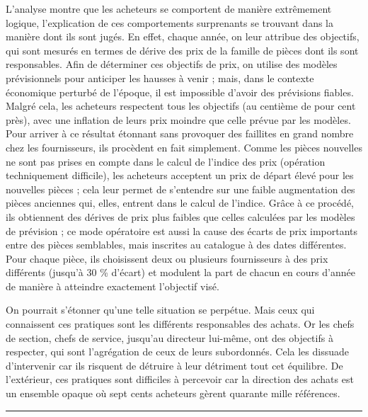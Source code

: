 \documentclass[oneside]{kaobook}
\begin{document}
L’analyse montre que les acheteurs se comportent de manière extrêmement logique, l’explication de ces comportements surprenants se trouvant dans la manière dont ils sont jugés. En effet, chaque année, on leur attribue des objectifs, qui sont mesurés en termes de dérive des prix de la famille de pièces dont ils sont responsables. Afin de déterminer ces objectifs de prix, on utilise des modèles prévisionnels pour anticiper les hausses à venir ; mais, dans le contexte économique perturbé de l’époque, il est impossible d’avoir des prévisions fiables. Malgré cela, les acheteurs respectent tous les objectifs (au centième de pour cent près), avec une inflation de leurs prix moindre que celle prévue par les modèles. Pour arriver à ce résultat étonnant sans provoquer des faillites en grand nombre chez les fournisseurs, ils procèdent en fait simplement. Comme les pièces nouvelles ne sont pas prises en compte dans le calcul de l’indice des prix (opération techniquement difficile), les acheteurs acceptent un prix de départ élevé pour les nouvelles pièces ; cela leur permet de s’entendre sur une faible augmentation des pièces anciennes qui, elles, entrent dans le calcul de l’indice. Grâce à ce procédé, ils obtiennent des dérives de prix plus faibles que celles calculées par les modèles de prévision ; ce mode opératoire est aussi la cause des écarts de prix importants entre des pièces semblables, mais inscrites au catalogue à des dates différentes. Pour chaque pièce, ils choisissent deux ou plusieurs fournisseurs à des prix différents (jusqu’à 30 \% d’écart) et modulent la part de chacun en cours d’année de manière à atteindre exactement l’objectif visé.

On pourrait s’étonner qu’une telle situation se perpétue. Mais ceux qui connaissent ces pratiques sont les différents responsables des achats. Or les chefs de section, chefs de service, jusqu’au directeur lui-même, ont des objectifs à respecter, qui sont l’agrégation de ceux de leurs subordonnés. Cela les dissuade d’intervenir car ils risquent de détruire à leur détriment tout cet équilibre. De l’extérieur, ces pratiques sont difficiles à percevoir car la direction des achats est un ensemble opaque où sept cents acheteurs gèrent quarante mille références.

\noindent\rule{\textwidth}{0.5pt}
\end{document}
